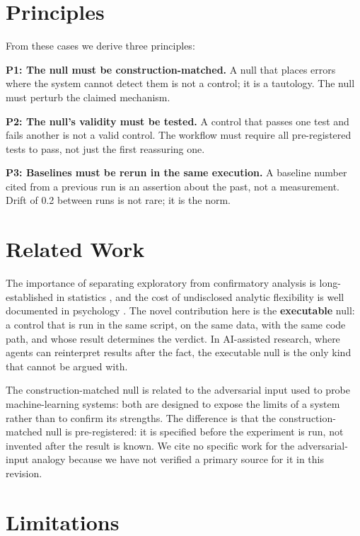\documentclass[11pt]{article}
\begin{document}
\section{Principles}

From these cases we derive three principles:

\textbf{P1: The null must be construction-matched.} A null that places
errors where the system cannot detect them is not a control; it is a
tautology. The null must perturb the claimed mechanism.

\textbf{P2: The null's validity must be tested.} A control that passes
one test and fails another is not a valid control. The workflow must
require all pre-registered tests to pass, not just the first reassuring
one.

\textbf{P3: Baselines must be rerun in the same execution.} A baseline
number cited from a previous run is an assertion about the past, not a
measurement. Drift of 0.2 between runs is not rare; it is the norm.

\section{Related Work}

The importance of separating exploratory from confirmatory analysis is
long-established in statistics \citep{tukey1980we}, and the cost of
undisclosed analytic flexibility is well documented in psychology
\citep{simmons2011false}. The novel contribution here
is the \textbf{executable} null: a control that is run in the same
script, on the same data, with the same code path, and whose result
determines the verdict. In AI-assisted research, where agents can
reinterpret results after the fact, the executable null is the only kind
that cannot be argued with.

The construction-matched null is related to the adversarial input used to
probe machine-learning systems: both are designed to expose the limits of
a system rather than to confirm its strengths. The difference is that the
construction-matched null is pre-registered: it is specified before the
experiment is run, not invented after the result is known. We cite no
specific work for the adversarial-input analogy because we have not
verified a primary source for it in this revision.

\section{Limitations}
\end{document}
